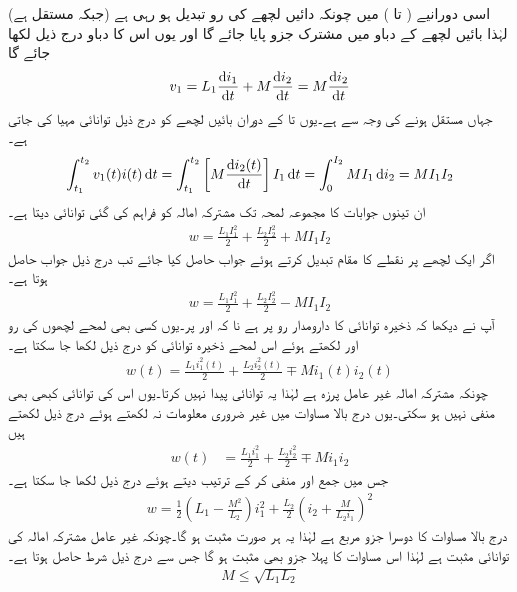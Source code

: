 اسی دورانیے ( تا )  میں چونکہ دائیں لچھے کی رو تبدیل ہو رہی ہے (جبکہ  مستقل ہے) لہٰذا بائیں لچھے کے دباو میں مشترک جزو پایا جائے گا اور یوں اس کا دباو درج ذیل لکھا جائے گا
\begin{align*}
v_1=L_1 \frac{\dif i_1}{\dif t}+M \frac{\dif i_2}{\dif t}=M\frac{\dif i_2}{\dif t}
\end{align*}
جہاں  مستقل ہونے کی وجہ سے  ہے۔یوں  تا  کے دوران بائیں لچھے کو درج ذیل توانائی مہیا کی جاتی ہے۔
\begin{align*}
\int_{t_1}^{t_2} v_1(t) i(t)\dif t=\int_{t_1}^{t_2} \left[M \frac{\dif i_2(t)}{\dif t}\right] I_1 \dif t=\int_{0}^{I_2} M I_1 \dif i_2=M I_1 I_2
\end{align*}
ان تینوں جوابات کا مجموعہ لمحہ  تک مشترکہ امالہ کو فراہم کی گئی توانائی دیتا ہے۔
\begin{align}
w=\frac{L_1 I_1^2}{2}+\frac{L_2 I_2^2}{2}+MI_1 I_2
\end{align}
اگر ایک لچھے پر نقطے کا مقام تبدیل کرتے ہوئے جواب حاصل کیا جائے تب درج ذیل جواب حاصل ہوتا ہے۔
\begin{align}
w=\frac{L_1 I_1^2}{2}+\frac{L_2 I_2^2}{2}-MI_1 I_2
\end{align}
آپ نے دیکھا کہ ذخیرہ توانائی کا دارومدار رو پر ہے نا کہ  اور  پر۔یوں کسی بھی لمحے لچھوں کی رو  اور  لکھتے ہوئے اس لمحے ذخیرہ توانائی کو درج ذیل لکھا جا سکتا ہے۔
\begin{align}
w(t)=\frac{L_1 i^2_1(t)}{2}+\frac{L_2 i^2_2(t)}{2}\mp M i_1(t) i_2(t)
\end{align}
چونکہ مشترکہ امالہ غیر عامل پرزہ ہے لہٰذا یہ توانائی پیدا نہیں کرتا۔یوں اس کی توانائی کبھی بھی منفی نہیں ہو سکتی۔یوں درج بالا مساوات میں غیر ضروری معلومات نہ لکھتے ہوئے درج ذیل لکھتے ہیں
\begin{align}
w(t)&=\frac{L_1 i^2_1}{2}+\frac{L_2 i^2_2}{2}\mp M i_1 i_2
\end{align}
جس میں  جمع اور منفی کر کے ترتیب دیتے ہوئے درج ذیل لکھا جا سکتا ہے۔
\begin{align}
w=\frac{1}{2} \left(L_1-\frac{M^2}{L_2}\right)i^2_1+\frac{L_2}{2}\left(i_2+\frac{M}{L_2 i_1}\right)^2
\end{align}
درج بالا مساوات کا دوسرا جزو مربع ہے لہٰذا یہ ہر صورت مثبت ہو گا۔چونکہ غیر عامل مشترکہ امالہ کی توانائی مثبت ہے لہٰذا اس مساوات کا پہلا جزو بھی مثبت ہو گا جس سے درج ذیل شرط حاصل ہوتا ہے۔
\begin{align}
M\le \sqrt{L_1 L_2}
\end{align}
